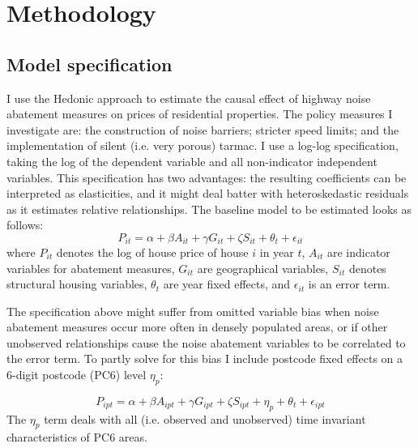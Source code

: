 \documentclass[12pt]{scrartcl}
\begin{document}
	\section{Methodology}
	\label{sec:method}
	
		\subsection{Model specification}	
		I use the Hedonic approach to estimate the causal effect of highway noise abatement measures on prices of residential properties. The policy measures I investigate are: the construction of noise barriers; stricter speed limits; and the implementation of silent (i.e. very porous) tarmac. I use a log-log specification, taking the log of the dependent variable and all non-indicator independent variables. This specification has two advantages: the resulting coefficients can be interpreted as elasticities, and it might deal batter with heteroskedastic residuals as it estimates relative relationships. The baseline model to be estimated looks as follows:
			\begin{equation}
			\label{spec:baseline}
			P_{it} = \alpha + \beta A_{it} + \gamma G_{it} + \zeta S_{it} + \theta_{t} + \epsilon_{it}
			\end{equation}
		where $P_{it}$ denotes the log of house price of house $i$ in year $t$, $A_{it}$ are indicator variables for abatement measures, $G_{it}$ are geographical variables, $S_{it}$ denotes structural housing variables, $\theta_{t}$ are year fixed effects, and $\epsilon_{it}$ is an error term.
	
		The specification above might suffer from omitted variable bias when noise abatement measures occur more often in densely populated areas, or if other unobserved relationships cause the noise abatement variables to be correlated to the error term. To partly solve for this bias I include postcode fixed effects on a 6-digit postcode (PC6) level $\eta_p$:
	
			\begin{equation}
			\label{spec:fe}
			P_{ipt} = \alpha + \beta A_{ipt} + \gamma G_{ipt} + \zeta S_{ipt} + \eta_{p} + \theta_{t} + \epsilon_{ipt}
			\end{equation}
		The $\eta_p$ term deals with all (i.e. observed and unobserved) time invariant characteristics of PC6 areas.
	
\end{document}
